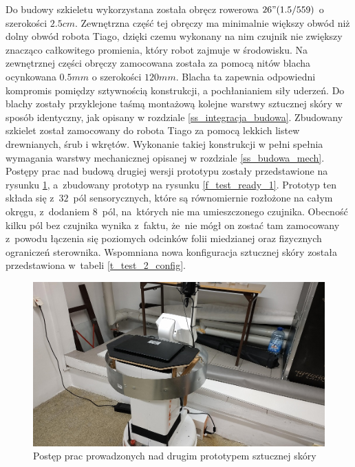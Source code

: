 Do budowy szkieletu wykorzystana została obręcz rowerowa $26" (1.5/559)$ o szerokości $2.5 cm$. Zewnętrzna część tej obręczy ma minimalnie większy obwód niż dolny obwód robota Tiago, dzięki czemu wykonany na nim czujnik nie zwiększy znacząco całkowitego promienia, który robot zajmuje w środowisku. Na zewnętrznej części obręczy zamocowana została za pomocą nitów blacha ocynkowana $0.5 mm$ o szerokości $120 mm$. Blacha ta zapewnia odpowiedni kompromis pomiędzy sztywnością konstrukcji, a pochłanianiem siły uderzeń. Do blachy zostały przyklejone taśmą montażową kolejne warstwy sztucznej skóry w sposób identyczny, jak opisany w rozdziale \ref{ss_integracja_budowa}.
Zbudowany szkielet został zamocowany do robota Tiago za pomocą lekkich listew drewnianych, śrub i wkrętów. 
Wykonanie takiej konstrukcji w pełni spełnia wymagania warstwy mechanicznej opisanej w rozdziale \ref{ss_budowa_mech}. Postępy prac nad budową drugiej wersji prototypu zostały przedstawione na rysunku \ref{f_test_prace_1}, a~zbudowany prototyp na rysunku \ref{f_test_ready_1}. Prototyp ten składa się z~$32$~pól sensorycznych, które są równomiernie rozłożone na całym okręgu, z~dodaniem $8$~pól, na~których nie ma umieszczonego czujnika. 
Obecność kilku pól bez czujnika wynika z~faktu, że~nie mógł on zostać tam zamocowany z~powodu łączenia się poziomych odcinków folii miedzianej oraz fizycznych ograniczeń sterownika. Wspomniana nowa konfiguracja sztucznej skóry została przedstawiona w~tabeli \ref{t_test_2_config}.

\begin{figure}[!h]
    \centering 
    \includegraphics[width=0.95\linewidth]{img/test_okr_prace_1.jpg}
    \caption{Postęp prac prowadzonych nad drugim prototypem sztucznej skóry}
    \label{f_test_prace_1}
\end{figure}

